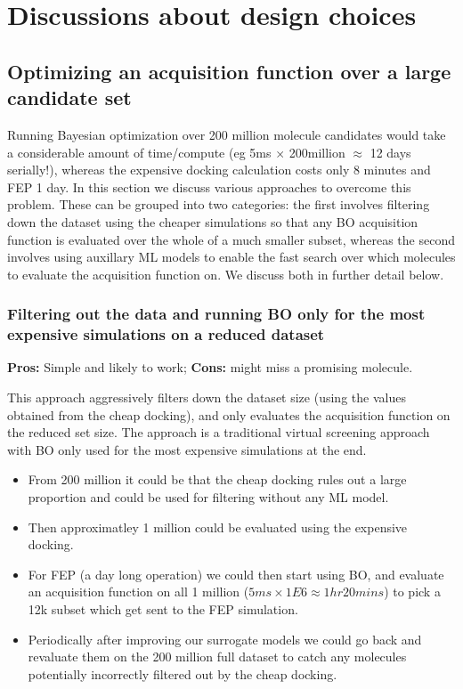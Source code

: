 \documentclass{article}
\begin{document}
\FloatBarrier



\section{Discussions about design choices}
\label{sect:design_choices}


\subsection{Optimizing an acquisition function over a large candidate set}

Running Bayesian optimization over 200 million molecule candidates would take a considerable amount of time/compute
(eg 5ms $\times$ 200million $\approx$ 12 days serially!),
whereas the expensive docking calculation costs only 8 minutes and FEP 1 day.
In this section we discuss various approaches to overcome this problem.
These can be grouped into two categories: the first involves filtering down the dataset using the cheaper simulations
so that any BO  acquisition function is evaluated over the whole of a much smaller subset, whereas the second involves using auxillary ML models to enable
the fast search over which molecules to evaluate the acquisition function on.
We discuss both in further detail below.

\subsubsection{Filtering out the data and running BO only for the most expensive simulations on a reduced dataset}
\label{sect:filter}
\textbf{Pros:} Simple and likely to work; \textbf{Cons:} might miss a promising molecule.


This approach aggressively filters down the dataset size (using the values obtained from the cheap docking),
and only evaluates the acquisition function on the reduced set size. 
The approach is a traditional virtual screening approach with BO only used for the most expensive simulations
at the end.

\begin{itemize}
\item From 200 million it could be that the cheap docking rules out a large proportion
and could be used for filtering without any ML model.
\item Then approximatley 1 million could be evaluated using the expensive docking. 
\item For FEP (a day long operation) we could then start using BO, and evaluate an acquisition function on all 1 million
  ($5ms \times 1E6 \approx 1hr 20mins$) to pick a 12k subset which get sent to the FEP simulation. 
\item Periodically after improving our surrogate models we could go back and revaluate them on the 200 million full dataset
to catch any molecules potentially incorrectly filtered out by the cheap docking.
\end{itemize}
\end{document}
